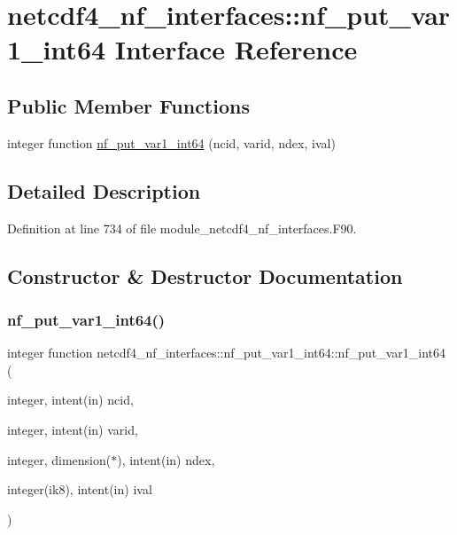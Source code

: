 \hypertarget{interfacenetcdf4__nf__interfaces_1_1nf__put__var1__int64}{}\section{netcdf4\+\_\+nf\+\_\+interfaces\+:\+:nf\+\_\+put\+\_\+var1\+\_\+int64 Interface Reference}
\label{interfacenetcdf4__nf__interfaces_1_1nf__put__var1__int64}
\subsection*{Public Member Functions}
\begin{DoxyCompactItemize}
\item 
integer function \hyperlink{interfacenetcdf4__nf__interfaces_1_1nf__put__var1__int64_a69bac7f4e358f85d00989afcac59a9d5}{nf\+\_\+put\+\_\+var1\+\_\+int64} (ncid, varid, ndex, ival)
\end{DoxyCompactItemize}


\subsection{Detailed Description}


Definition at line 734 of file module\+\_\+netcdf4\+\_\+nf\+\_\+interfaces.\+F90.



\subsection{Constructor \& Destructor Documentation}
\mbox{\label{interfacenetcdf4__nf__interfaces_1_1nf__put__var1__int64_a69bac7f4e358f85d00989afcac59a9d5}} 
\subsubsection{\texorpdfstring{nf\+\_\+put\+\_\+var1\+\_\+int64()}{nf\_put\_var1\_int64()}}
{\footnotesize\ttfamily integer function netcdf4\+\_\+nf\+\_\+interfaces\+::nf\+\_\+put\+\_\+var1\+\_\+int64\+::nf\+\_\+put\+\_\+var1\+\_\+int64 (\begin{DoxyParamCaption}\item[{integer, intent(in)}]{ncid,  }\item[{integer, intent(in)}]{varid,  }\item[{integer, dimension($\ast$), intent(in)}]{ndex,  }\item[{integer(ik8), intent(in)}]{ival }\end{DoxyParamCaption})}




